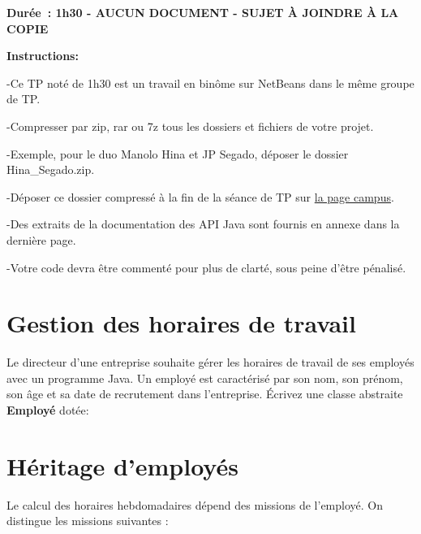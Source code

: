 
\begin{center}
\textbf{Durée : 1h30 - AUCUN DOCUMENT - SUJET À JOINDRE À LA COPIE}
\end{center}
\bigskip

\textbf{Instructions:}

-Ce TP noté de 1h30 est un travail en binôme sur NetBeans dans le même groupe de TP.

-Compresser par zip, rar ou 7z tous les dossiers et fichiers de votre projet.

-Exemple, pour le duo Manolo Hina et JP Segado, déposer le dossier Hina\_Segado.zip.

-Déposer ce dossier compressé à la fin de la séance de TP sur \href{https://pedago-ece.campusonline.me/course/view.php?id=124}{la page campus}.

-Des extraits de la documentation des API Java sont fournis en annexe dans la dernière page.

-Votre code devra être commenté pour plus de clarté,
	sous peine d’être pénalisé.



\section{Gestion des horaires de travail}
Le directeur d’une entreprise souhaite gérer les horaires de travail de ses employés avec un programme Java.
Un employé est caractérisé par son nom,
	son prénom,
	son âge et sa date de recrutement dans l’entreprise.
Écrivez une classe abstraite \textbf{Employé} dotée:

\section{Héritage d’employés}

Le calcul des horaires hebdomadaires dépend des missions de l’employé.
On distingue les missions suivantes :

